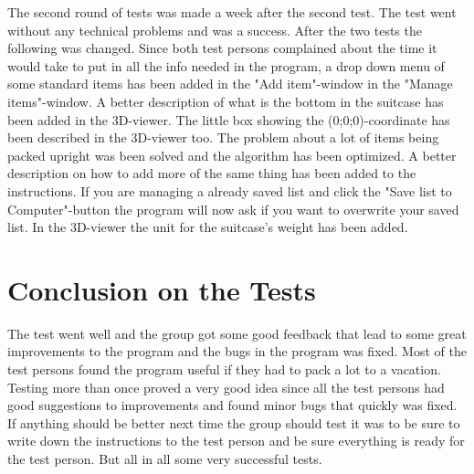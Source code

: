 The second round of tests was made a week after the second test. The test went without any technical problems and was a success. After the two tests the following was changed. Since both test persons complained about the time it would take to put in all the info needed in the program, a drop down menu of some standard items has been added in the "Add item"-window in the "Manage items"-window. A better description of what is the bottom in the suitcase has been added in the 3D-viewer. The little box showing the (0;0;0)-coordinate has been described in the 3D-viewer too. The problem about a lot of items being packed upright was been solved and the algorithm has been optimized. A better description on how to add more of the same thing has been added to the instructions. If you are managing a already saved list and click the "Save list to Computer"-button the program will now ask if you want to overwrite your saved list. In the 3D-viewer the unit for the suitcase's weight has been added.

\section{Conclusion on the Tests}
The test went well and the group got some good feedback that lead to some great improvements to the program and the bugs in the program was fixed. Most of the test persons found the program useful if they had to pack a lot to a vacation. Testing more than once proved a very good idea since all the test persons had good suggestions to improvements and found minor bugs that quickly was fixed. If anything should be better next time the group should test it was to be sure to write down the instructions to the test person and be sure everything is ready for the test person. But all in all some very successful tests.